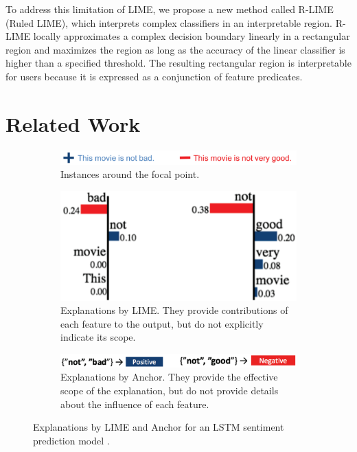 \documentclass[runningheads]{llncs}
\begin{document}
To address this limitation of LIME,
we propose a new method called R-LIME (Ruled LIME),
which interprets complex classifiers in an interpretable region.
R-LIME locally approximates a complex decision boundary linearly
in a rectangular region and maximizes the region as long as the accuracy of the linear
classifier is higher than a specified threshold.
The resulting rectangular region is interpretable for users because it is
expressed as a conjunction of feature predicates.

\section{Related Work}
\begin{figure}[t]
  \centering
  \vspace{0.5cm}
  \begin{subfigure}[t]{0.55\textwidth}
    \centering
    \includegraphics[width=\textwidth]{lime_vs_anchor_exp_a.png}
    \caption{Instances around the focal point.}\label{fig:lime_vs_anchor_exp_a}
    \vspace{0.5cm}
  \end{subfigure}
  \begin{subfigure}[t]{0.45\textwidth}
    \centering
    \includegraphics[width=\textwidth]{lime_vs_anchor_exp_b.png}
    \caption{%
      Explanations by LIME\@.
      They provide contributions of each feature to the output,
      but do not explicitly indicate its scope.
    }\label{fig:lime_vs_anchor_exp_b}
    \vspace{0.5cm}
  \end{subfigure}
  \begin{subfigure}[t]{0.55\textwidth}
    \centering
    \includegraphics[width=\textwidth]{lime_vs_anchor_exp_c.png}
    \caption{%
      Explanations by Anchor.
      They provide the effective scope of the explanation,
      but do not provide details about the influence of each feature.
    }\label{fig:lime_vs_anchor_exp_c}
  \end{subfigure}
  \caption{%
    Explanations by LIME and Anchor
    for an LSTM sentiment prediction model \cite{ribeiro2018anchors}.
  }\label{fig:lime_vs_anchor_exp}
\end{figure}
\end{document}
